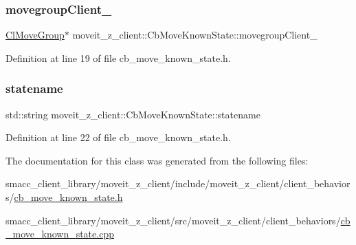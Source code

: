 \subsubsection{\texorpdfstring{movegroup\+Client\+\_\+}{movegroupClient\_}}
{\footnotesize\ttfamily \hyperlink{classmoveit__z__client_1_1ClMoveGroup}{Cl\+Move\+Group}$\ast$ moveit\+\_\+z\+\_\+client\+::\+Cb\+Move\+Known\+State\+::movegroup\+Client\+\_\+\hspace{0.3cm}{\ttfamily [protected]}}



Definition at line 19 of file cb\+\_\+move\+\_\+known\+\_\+state.\+h.

\mbox{\label{classmoveit__z__client_1_1CbMoveKnownState_a53449b08ffa077adb2f1d4efbd37f8d0}} 
\subsubsection{\texorpdfstring{statename}{statename}}
{\footnotesize\ttfamily std\+::string moveit\+\_\+z\+\_\+client\+::\+Cb\+Move\+Known\+State\+::statename}



Definition at line 22 of file cb\+\_\+move\+\_\+known\+\_\+state.\+h.



The documentation for this class was generated from the following files\+:\begin{DoxyCompactItemize}
\item 
smacc\+\_\+client\+\_\+library/moveit\+\_\+z\+\_\+client/include/moveit\+\_\+z\+\_\+client/client\+\_\+behaviors/\hyperlink{cb__move__known__state_8h}{cb\+\_\+move\+\_\+known\+\_\+state.\+h}\item 
smacc\+\_\+client\+\_\+library/moveit\+\_\+z\+\_\+client/src/moveit\+\_\+z\+\_\+client/client\+\_\+behaviors/\hyperlink{cb__move__known__state_8cpp}{cb\+\_\+move\+\_\+known\+\_\+state.\+cpp}\end{DoxyCompactItemize}
